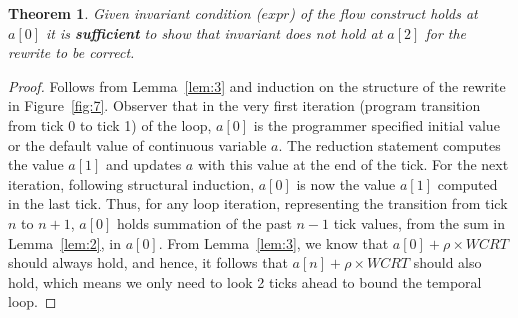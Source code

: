 \documentclass[10pt,journal,cspaper,compsoc]{IEEEtran}
\newtheorem{thm}{Theorem}
\begin{document}
\begin{thm}
  Given invariant condition ($expr$) of the flow construct holds at
  $a[0]$ it is \textbf{sufficient} to show that invariant does not
  hold at $a[2]$ for the rewrite to be correct.
  \label{thm:1}
\end{thm}

\begin{proof}
  Follows from Lemma~\ref{lem:3} and induction on the structure of the
  rewrite in Figure~\ref{fig:7}. Observer that in the very first
  iteration (program transition from tick 0 to tick 1) of the loop,
  $a[0]$ is the programmer specified initial value or the default value
  of continuous variable $a$. The reduction statement computes the value
  $a[1]$ and updates $a$ with this value at the end of the tick. For the
  next iteration, following structural induction, $a[0]$ is now the
  value $a[1]$ computed in the last tick. Thus, for any loop iteration,
  representing the transition from tick $n$ to $n+1$, $a[0]$ holds
  summation of the past $n-1$ tick values, from the sum in
  Lemma~\ref{lem:2}, in $a[0]$. From Lemma~\ref{lem:3}, we know that
  $a[0] + \rho \times WCRT$ should always hold, and hence, it follows
  that $a[n] + \rho \times WCRT$ should also hold, which means we only
  need to look 2 ticks ahead to bound the temporal loop.


\end{proof}
\end{document}
